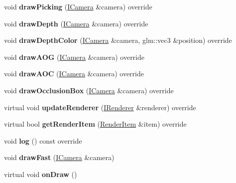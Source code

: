 \begin{DoxyCompactItemize}
\item 
\mbox{\label{classflw_1_1flf_1_1Mesh_a37b6ab72fb1beea5f29701c844a47d49}} 
void {\bfseries draw\+Picking} (\hyperlink{classflw_1_1flf_1_1ICamera}{I\+Camera} \&camera) override
\item 
\mbox{\label{classflw_1_1flf_1_1Mesh_ae8710aaf0b7354622af2ad55e0570490}} 
void {\bfseries draw\+Depth} (\hyperlink{classflw_1_1flf_1_1ICamera}{I\+Camera} \&camera) override
\item 
\mbox{\label{classflw_1_1flf_1_1Mesh_a435ad4cabc8f1611b713c6b09082e838}} 
void {\bfseries draw\+Depth\+Color} (\hyperlink{classflw_1_1flf_1_1ICamera}{I\+Camera} \&camera, glm\+::vec3 \&position) override
\item 
\mbox{\label{classflw_1_1flf_1_1Mesh_a43695718bb7376f783c19497add06329}} 
void {\bfseries draw\+A\+OG} (\hyperlink{classflw_1_1flf_1_1ICamera}{I\+Camera} \&camera) override
\item 
\mbox{\label{classflw_1_1flf_1_1Mesh_af6cdec25aeb22e3133944ea150c24074}} 
void {\bfseries draw\+A\+OC} (\hyperlink{classflw_1_1flf_1_1ICamera}{I\+Camera} \&camera) override
\item 
\mbox{\label{classflw_1_1flf_1_1Mesh_a4a48059089ddc47c0d61e01d92b57e8e}} 
void {\bfseries draw\+Occlusion\+Box} (\hyperlink{classflw_1_1flf_1_1ICamera}{I\+Camera} \&camera) override
\item 
\mbox{\label{classflw_1_1flf_1_1Mesh_a40e9cc7c8a77c3d494193baefc59ad7f}} 
virtual void {\bfseries update\+Renderer} (\hyperlink{classflw_1_1flf_1_1IRenderer}{I\+Renderer} \&renderer) override
\item 
\mbox{\label{classflw_1_1flf_1_1Mesh_a2d57bb274b8660d247fda746bed31c8a}} 
virtual bool {\bfseries get\+Render\+Item} (\hyperlink{structflw_1_1flf_1_1RenderItem}{Render\+Item} \&item) override
\item 
\mbox{\label{classflw_1_1flf_1_1Mesh_a3b4d5eb83608872b4bb9a2ca8d90f554}} 
void {\bfseries log} () const override
\item 
\mbox{\label{classflw_1_1flf_1_1Mesh_a071a39786512f0bf9802c4329bb1896f}} 
void {\bfseries draw\+Fast} (\hyperlink{classflw_1_1flf_1_1ICamera}{I\+Camera} \&camera)
\item 
\mbox{\label{classflw_1_1flf_1_1Mesh_afe93d72676657e1ece41f060e43b2c93}} 
virtual void {\bfseries on\+Draw} ()
\end{DoxyCompactItemize}
